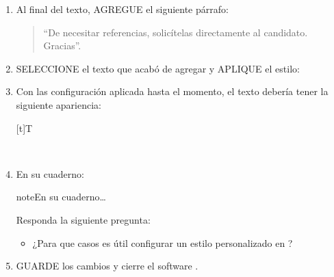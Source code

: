 \documentclass[letterpaper,10pt,spanish]{sphinxmanual}
\let\sphinxpxdimen\pdfpxdimen\else\newdimen\sphinxpxdimen
\begin{document}
\begin{enumerate}
\begin{itemize}
\begin{itemize}
\begin{itemize}
\begin{itemize}
\end{itemize}

\end{itemize}

\end{itemize}

\item {} 
\sphinxAtStartPar
PULSE el botón .

\end{itemize}

\item {} 
\sphinxAtStartPar
Al final del texto, AGREGUE el siguiente párrafo:
\begin{quote}

\sphinxAtStartPar
“De necesitar referencias, solicítelas directamente al candidato. Gracias”.
\end{quote}

\item {} 
\sphinxAtStartPar
SELECCIONE el texto que acabó de agregar y APLIQUE el estilo: 

\item {} 
\sphinxAtStartPar
Con las configuración aplicada hasta el momento, el texto debería tener la siguiente apariencia:


\begin{savenotes}\sphinxattablestart
\sphinxthistablewithglobalstyle
\centering
\begin{tabulary}{\linewidth}[t]{T}
\sphinxtoprule
\sphinxtableatstartofbodyhook

\begin{sphinxfigure-in-table}
\centering

\noindent\sphinxincludegraphics[width=300\sphinxpxdimen]{{image27}.png}
\end{sphinxfigure-in-table}\relax
\\
\sphinxbottomrule
\end{tabulary}
\sphinxtableafterendhook\par
\sphinxattableend\end{savenotes}

\item {} 
\sphinxAtStartPar
En su cuaderno:

\begin{sphinxadmonition}{note}{En su cuaderno…}

\sphinxAtStartPar
Responda la siguiente pregunta:
\begin{itemize}
\item {} 
\sphinxAtStartPar
¿Para que casos es útil configurar un estilo personalizado en ?

\end{itemize}
\end{sphinxadmonition}

\item {} 
\sphinxAtStartPar
GUARDE los cambios y cierre el software .

\end{enumerate}
\end{document}
